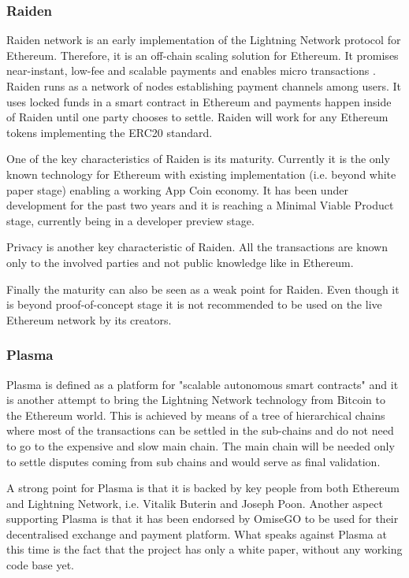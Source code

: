 \subsubsection{Raiden}
Raiden network is an early implementation of the Lightning Network protocol for Ethereum. Therefore, it is an off-chain scaling solution for Ethereum. It promises near-instant, low-fee and scalable payments and enables micro transactions \cite{Raiden}. Raiden runs as a network of nodes establishing payment channels among users. It uses locked funds in a smart contract in Ethereum and payments happen inside of Raiden until one party chooses to settle. Raiden will work for any Ethereum tokens implementing the ERC20 standard.

\medskip

One of the key characteristics of Raiden is its maturity. Currently it is the only known technology for Ethereum with existing implementation (i.e. beyond white paper stage) enabling a working App Coin economy. It has been under development for the past two years and it is reaching a Minimal Viable Product stage, currently being in a developer preview stage.

\medskip

Privacy is another key characteristic of Raiden.  All the transactions are known only to the involved parties and not public knowledge like in Ethereum.

\medskip

Finally the maturity can also be seen as a weak point for Raiden. Even though it is beyond proof-of-concept stage it is not recommended to be used on the live Ethereum network by its creators.

\subsubsection{Plasma}
Plasma is defined as a platform for "scalable autonomous smart contracts" \cite{Plasma} and it is another attempt to bring the Lightning Network technology from Bitcoin to the Ethereum world. This is achieved by means of a tree of hierarchical chains where most of the transactions can be settled in the sub-chains and do not need to go to the expensive and slow main chain. The main chain will be needed only to settle disputes coming from sub chains and would serve as final validation.

\medskip

A strong point for Plasma is that it is backed by key people from both Ethereum and Lightning Network, i.e. Vitalik Buterin and Joseph Poon. Another aspect supporting Plasma is that it has been endorsed by OmiseGO to be used for their decentralised exchange and payment platform\cite{omisego_plasma}. What speaks against Plasma at this time is the fact that the project has only a white paper, without any working code base yet.

